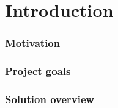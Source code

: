 \chapter*{Introduction}
\label{chap:introduction}
\subsection*{Motivation}
\label{subsec:motivation}
\subsection*{Project goals}
\label{subsec:project-goals}
\subsection*{Solution overview}
\label{subsec:solution-overview}




